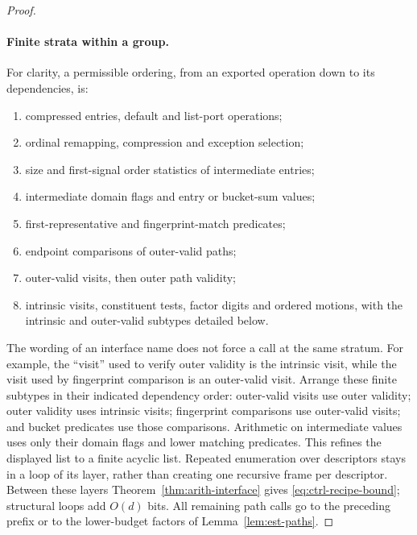 \begin{proof}
\paragraph{Finite strata within a group.}
For clarity, a permissible ordering, from an exported operation down
to its dependencies, is:
\begin{enumerate}
\item compressed entries, default and list-port operations;
\item ordinal remapping, compression and exception selection;
\item size and first-signal order statistics of intermediate entries;
\item intermediate domain flags and entry or bucket-sum values;
\item first-representative and fingerprint-match predicates;
\item endpoint comparisons of outer-valid paths;
\item outer-valid visits, then outer path validity;
\item intrinsic visits, constituent tests, factor digits and ordered
  motions, with the intrinsic and outer-valid subtypes detailed below.
\end{enumerate}
The wording of an interface name does not force a call at the same
stratum.  For example, the ``visit'' used to verify outer validity is
the intrinsic visit, while the visit used by fingerprint comparison is an
outer-valid visit.  Arrange these finite subtypes in their indicated
dependency order: outer-valid visits use outer validity; outer validity
uses intrinsic visits; fingerprint comparisons use outer-valid visits; and
bucket predicates use those comparisons.  Arithmetic on intermediate
values uses only their domain flags and lower matching predicates.
This refines the displayed list to a finite acyclic list.  Repeated
enumeration over descriptors stays in a loop of its layer, rather than
creating one recursive frame per descriptor.  Between these layers
Theorem~\ref{thm:arith-interface} gives \eqref{eq:ctrl-recipe-bound};
structural loops add $O(d)$ bits.  All remaining path calls go to the
preceding prefix or to the lower-budget factors of
Lemma~\ref{lem:est-paths}.


\end{proof}
